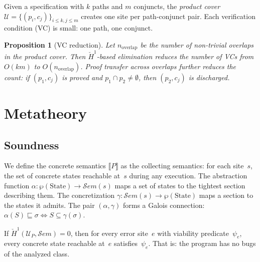\documentclass[acmsmall,screen,review,anonymous]{acmart}
\newtheorem{proposition}[theorem]{Proposition}
\theoremstyle{remark}
\newcommand{\Sem}{\mathcal{S}\mathit{em}}
\newcommand{\Hc}[1]{\check{H}^{#1}}
\begin{document}
Given a specification with $k$ paths and $m$ conjuncts, the
\emph{product cover} $\mathcal{U} = \{(p_i, c_j)\}_{i \leq k, j \leq m}$
creates one site per path-conjunct pair.  Each verification condition
(VC) is small: one path, one conjunct.

\begin{proposition}[VC reduction]\label{prop:vc-reduction}
Let $n_{\mathrm{overlap}}$ be the number of non-trivial overlaps in
the product cover.  Then $\Hc{1}$-based elimination reduces the
number of VCs from $O(km)$ to $O(n_{\mathrm{overlap}})$.
Proof transfer across overlaps further reduces the count:
if $(p_1, c_j)$ is proved and $p_1 \cap p_2 \neq \emptyset$,
then $(p_2, c_j)$ is discharged.
\end{proposition}

\section{Metatheory}\label{sec:metatheory}

\subsection{Soundness}\label{sec:soundness}

We define the concrete semantics $\llbracket P \rrbracket$ as the
collecting semantics: for each site~$s$, the set of concrete states
reachable at~$s$ during any execution.  The abstraction function
$\alpha : \wp(\mathrm{State}) \to \Sem(s)$ maps a set of states to
the tightest section describing them.  The concretization
$\gamma : \Sem(s) \to \wp(\mathrm{State})$ maps a section to the
states it admits.  The pair $(\alpha, \gamma)$ forms a Galois
connection: $\alpha(S) \sqsubseteq \sigma \iff S \subseteq \gamma(\sigma)$.

\begin{theorem}[Soundness]\label{thm:soundness}
If $\Hc{1}(\mathcal{U}_P, \Sem) = 0$, then for every error site~$e$
with viability predicate~$\psi_e$, every concrete state reachable
at~$e$ satisfies~$\psi_e$.  That is: the program has no bugs of the
analyzed class.
\end{theorem}
\end{document}

